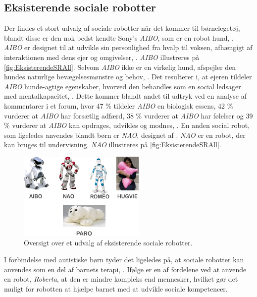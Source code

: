 \subsection{Eksisterende sociale robotter}
\label{EksisterendeSocialeRobotter}
%
Der findes et stort udvalg af sociale robotter når det kommer til børnelegetøj, blandt disse er den nok bedst kendte Sony's \textit{AIBO}, som er en robot hund, \parencite{WEB:AIBO}. \textit{AIBO} er designet til at udvikle sin personlighed fra hvalp til voksen, afhængigt af interaktionen med dens ejer og omgivelser, \parencite{WEB:AIBO}. \textit{AIBO} illustreres på \autoref{fig:EksisterendeSRAll}. Selvom \textit{AIBO} ikke er en virkelig hund, afspejler den hundes naturlige bevægelsesmønstre og behov, \parencite[ss. 191-198]{PDF:AnEthologicalEmotional}. Det resulterer i, at ejeren tildeler \textit{AIBO} hunde-agtige egenskaber, hvorved den behandles som en social ledsager med mentalkapacitet, \parencite[s. 2]{PDF:SharingALifeHarvey}. Dette kommer blandt andet til udtryk ved en analyse af kommentarer i et forum, hvor 47 \% tildeler \textit{AIBO} en biologisk essens, 42 \% vurderer at \textit{AIBO} har forsætlig adfærd, 38 \% vurderer at \textit{AIBO} har følelser og 39 \% vurderer at \textit{AIBO} kan opdrages, udvikles og modnes, \parencite[s. 26]{PDF:InTheCompanyofRobots}. En anden social robot, som ligeledes anvendes blandt børn er \textit{NAO}, designet af \textcite{WEB:NAO}. \textit{NAO} er en robot, der kan bruges til undervisning. \textit{NAO} illustreres på \autoref{fig:EksisterendeSRAll}.
%
\begin{figure}[H]
\centering
\includegraphics[width = 0.55\textwidth]{Figure/Introduktion/EksisterendeSRAll} 
\caption{Oversigt over et udvalg af eksisterende sociale robotter.}
\label{fig:EksisterendeSRAll}
\end{figure}
\noindent 
%  
I forbindelse med autistiske børn tyder det ligeledes på, at sociale robotter kan anvendes som en del af barnets terapi, \parencite[s. 180]{PDF:GamesChrildrenAutism}. Ifølge \textcite[s. 185]{PDF:GamesChrildrenAutism} er en af fordelene ved at anvende en robot, \textit{Roberta}, at den er mindre kompleks end mennesker, hvilket gør det muligt for robotten at hjælpe barnet med at udvikle sociale kompetencer.
  
